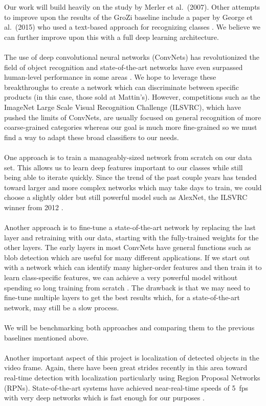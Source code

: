 \documentclass{article}
\begin{document}
Our work will build heavily on the study by Merler et al.\ (2007). Other attempts to improve upon the results of the GroZi baseline include a paper by George et al.\ (2015) who used a text-based approach for recognizing classes \cite{george15}. We believe we can further improve upon this with a full deep learning architecture.
\\ \\
The use of deep convolutional neural networks (ConvNets) has revolutionized the field of object recognition and state-of-the-art networks have even surpassed human-level performance in some areas \cite{he15,russakovsky14}. We hope to leverage these breakthroughs to create a network which can discriminate between specific products (in this case, those sold at Mattin's). However, competitions such as the ImageNet Large Scale Visual Recognition Challenge (ILSVRC), which have pushed the limits of ConvNets, are usually focused on general recognition of more coarse-grained categories whereas our goal is much more fine-grained so we must find a way to adapt these broad classifiers to our needs.
\\ \\
One approach is to train a manageably-sized network from scratch on our data set. This allows us to learn deep features important to our classes while still being able to iterate quickly. Since the trend of the past couple years has tended toward larger and more complex networks which may take days to train, we could choose a slightly older but still powerful model such as AlexNet, the ILSVRC winner from 2012 \cite{krizhevsky12}.
\\ \\
Another approach is to fine-tune a state-of-the-art network by replacing the last layer and retraining with our data, starting with the fully-trained weights for the other layers. The early layers in most ConvNets have general functions such as blob detection which are useful for many different applications. If we start out with a network which can identify many higher-order features and then train it to learn class-specific features, we can achieve a very powerful model without spending so long training from scratch \cite{donahue13}. The drawback is that we may need to fine-tune multiple layers to get the best results which, for a state-of-the-art network, may still be a slow process.
\\ \\
We will be benchmarking both approaches and comparing them to the previous baselines mentioned above.
\\ \\
Another important aspect of this project is localization of detected objects in the video frame. Again, there have been great strides recently in this area toward real-time detection with localization particularly using Region Proposal Networks (RPNs). State-of-the-art systems have achieved near-real-time speeds of 5~fps with very deep networks which is fast enough for our purposes \cite{ren15}.
\end{document}
